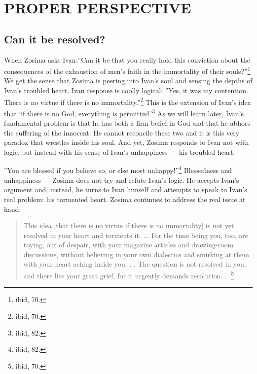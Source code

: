 \chapter{PROPER PERSPECTIVE}
	\section{Can it be resolved?}

When Zosima asks Ivan:''Can it be that you really hold this conviction about the consequences of the exhaustion of men's faith in the immortality of their souls?''\footnote{ibid, 70.} We get the sense that Zosima is peering into Ivan's soul and sensing the depths of Ivan's troubled heart. Ivan response is coolly logical: ''Yes, it was my contention. There is no virtue if there is no immortality.''\footnote{ibid, 70.} This is the extension of Ivan's idea that `if there is no God, everything is permitted.'\footnote{ibid, 82.} As we will learn later, Ivan's fundamental problem is that he has both a firm belief in God and that he abhors the suffering of the innocent. He cannot reconcile these two and it is this very paradox that wrestles inside his soul. And yet, Zosima responds to Ivan not with logic, but instead with his sense of Ivan's unhappiness --- his troubled heart.

''You are blessed if you believe so, or else most unhappy!''\footnote{ibid, 82.} Blessedness and unhappiness --- Zosima does not try and refute Ivan's logic. He accepts Ivan's argument and, instead, he turns to Ivan himself and attempts to speak to Ivan's real problem: his tormented heart. Zosima continues to address the real issue at hand: 

\begin{quote}
This idea [that there is no virtue if there is no immortality] is not yet resolved in your heart and torments it. ... For the time being you, too, are toying, out of despair, with your magazine articles and drawing-room discussions, without believing in your own dialectics and smirking at them with your heart aching inside you. . . The question is not resolved in you, and there lies your great grief, for it urgently demands resolution. . .\footnote{ibid, 70.}
\end{quote}

